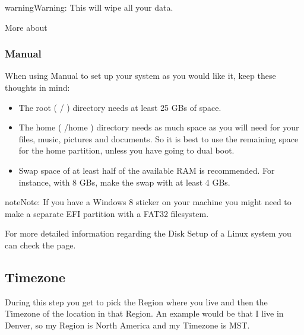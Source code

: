 \documentclass[letterpaper,10pt,english]{sphinxmanual}
\begin{document}
\begin{sphinxadmonition}{warning}{Warning:}
\sphinxAtStartPar
This will wipe all your data.
\end{sphinxadmonition}

\sphinxAtStartPar
More about 


\subsubsection{Manual}
\label{\detokenize{docs/installation:manual}}
\sphinxAtStartPar
When using Manual to set up your system as you would like it, keep these thoughts in mind:
\begin{itemize}
\item {} 
\sphinxAtStartPar
The root ( / ) directory needs at least 25 GBs of space.

\item {} 
\sphinxAtStartPar
The home ( /home ) directory needs as much space as you will need for your files, music, pictures and documents.
So it is best to use the remaining space for the home partition, unless you have going to dual boot.

\item {} 
\sphinxAtStartPar
Swap space of at least half of the available RAM is recommended. For instance, with 8 GBs, make the swap with at least 4 GBs.

\end{itemize}

\begin{sphinxadmonition}{note}{Note:}
\sphinxAtStartPar
If you have a Windows 8 sticker on your machine you might need to make a separate EFI partition with a FAT32 filesystem.
\end{sphinxadmonition}

\sphinxAtStartPar
For more detailed information regarding the Disk Setup of a Linux system you can check the  page.


\subsection{Timezone}
\label{\detokenize{docs/installation:timezone}}
\sphinxAtStartPar
During this step you get to pick the Region where you live and then the Timezone of the location in that Region. An example would be that I live in Denver, so my Region is North America and my Timezone is MST.
\end{document}
